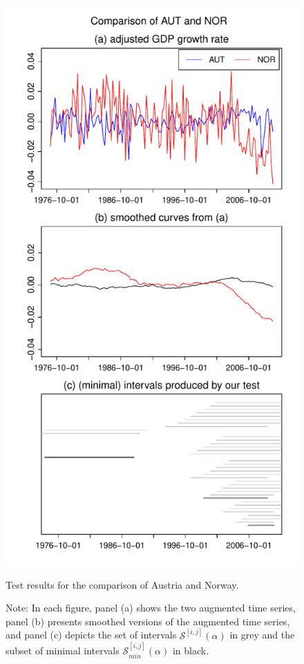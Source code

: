 \documentclass[a4paper,12pt]{article}
\begin{document}
\begin{figure}[b!]
\begin{minipage}[t]{0.49\textwidth}
\includegraphics[width=\textwidth]{Plots/gdp/AUT_vs_NOR}
\caption{Test results for the comparison of Austria and Norway.}\label{fig:Austria:Norway}
\end{minipage}
\caption*{Note: In each figure, panel (a) shows the two augmented time series, panel (b) presents smoothed versions of the augmented time series, and panel (c) depicts the set of intervals $\mathcal{S}^{[i, j]}(\alpha)$ in grey and the subset of minimal intervals $\mathcal{S}^{[i, j]}_{min}(\alpha)$ in black.}
\end{figure}
\end{document}
